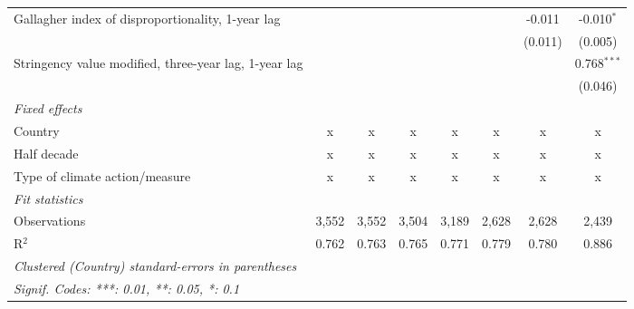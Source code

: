 \begin{table}[htbp]
\begin{tabular}{lccccccc}
      Gallagher index of disproportionality, 1-year lag     &         &         &             &             &               & -0.011        & -0.010$^{*}$\\   
                                                            &         &         &             &             &               & (0.011)       & (0.005)\\   
      Stringency value modified, three-year lag, 1-year lag &         &         &             &             &               &               & 0.768$^{***}$\\   
                                                            &         &         &             &             &               &               & (0.046)\\   
      \emph{Fixed effects}\\
      Country                                               & x       & x       & x           & x           & x             & x             & x\\  
      Half decade                                           & x       & x       & x           & x           & x             & x             & x\\  
      Type of climate action/measure                        & x       & x       & x           & x           & x             & x             & x\\  
      \midrule \emph{Fit statistics}\\
      Observations                                          & 3,552   & 3,552   & 3,504       & 3,189       & 2,628         & 2,628         & 2,439\\  
      R$^2$                                                 & 0.762   & 0.763   & 0.765       & 0.771       & 0.779         & 0.780         & 0.886\\  
      \midrule
      \multicolumn{8}{l}{\emph{Clustered (Country) standard-errors in parentheses}}\\
      \multicolumn{8}{l}{\emph{Signif. Codes: ***: 0.01, **: 0.05, *: 0.1}}\\
   \end{tabular}
\end{table}


